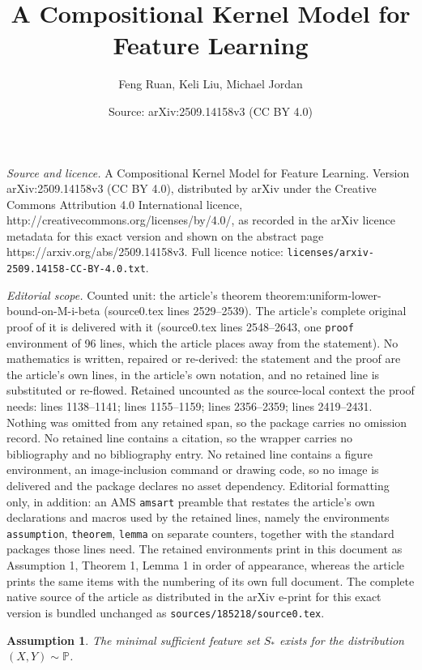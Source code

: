 \documentclass[10pt,a4paper]{amsart}
\title{A Compositional Kernel Model for Feature Learning}
\author{Feng Ruan, Keli Liu, Michael Jordan}
\date{Source: arXiv:2509.14158v3 (CC BY 4.0)}
\newtheorem{assumption}{Assumption}
\renewcommand{\P}{\mathbb{P}}
\begin{document}
\maketitle

\noindent\emph{Source and licence.} A Compositional Kernel Model for Feature Learning. Version arXiv:2509.14158v3 (CC BY 4.0), distributed by arXiv under the Creative Commons Attribution 4.0 International licence, http://creativecommons.org/licenses/by/4.0/, as recorded in the arXiv licence metadata for this exact version and shown on the abstract page https://arxiv.org/abs/2509.14158v3. Full licence notice: \texttt{licenses/arxiv-2509.14158-CC-BY-4.0.txt}.\par\smallskip

\noindent\textit{Editorial scope.} Counted unit: the article's theorem theorem:uniform-lower-bound-on-M-i-beta (source0.tex lines 2529--2539). The article's complete original proof of it is delivered with it (source0.tex lines 2548--2643, one \texttt{proof} environment of 96 lines, which the article places away from the statement). No mathematics is written, repaired or re-derived: the statement and the proof are the article's own lines, in the article's own notation, and no retained line is substituted or re-flowed.  Retained uncounted as the source-local context the proof needs: lines 1138--1141; lines 1155--1159; lines 2356--2359; lines 2419--2431.  Nothing was omitted from any retained span, so the package carries no omission record.  No retained line contains a citation, so the wrapper carries no bibliography and no bibliography entry.  No retained line contains a figure environment, an image-inclusion command or drawing code, so no image is delivered and the package declares no asset dependency.  Editorial formatting only, in addition: an AMS \texttt{amsart} preamble that restates the article's own declarations and macros used by the retained lines, namely the environments \texttt{assumption}, \texttt{theorem}, \texttt{lemma} on separate counters, together with the standard packages those lines need.  The retained environments print in this document as Assumption 1, Theorem 1, Lemma 1 in order of appearance, whereas the article prints the same items with the numbering of its own full document.  The complete native source of the article as distributed in the arXiv e-print for this exact version is bundled unchanged as \texttt{sources/185218/source0.tex}.
\begin{assumption}
\label{assumption:existence-of-csfs}
The minimal sufficient feature set $S_*$ exists for the distribution $(X, Y) \sim \P$. 
\end{assumption} 
\end{document}
